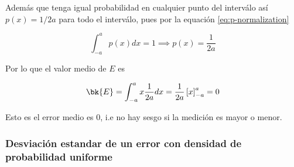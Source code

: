 Además que tenga igual probabilidad en cualquier punto del
interválo así $p(x) = 1/2a$ para todo el interválo, pues por la equación
\eqref{eq:p-normalization}

\begin{equation}
  \int_{-a}^a p(x) dx = 1 \implies p(x) = \frac{1}{2a}
  \label{eq:E-densidad-prob}
\end{equation}

Por lo que el valor medio de $E$ es

\begin{equation}
  \bk{E} = \int_{-a}^a x \frac{1}{2a}dx = \frac{1}{2a}\left[x\right]_{-a}^a = 0
  \label{eq:mean-error}
\end{equation}

Esto es el error medio es 0, i.e no hay sesgo si la medición es mayor o menor.


\subsubsection{Desviación estandar de un error con densidad de probabilidad uniforme}

